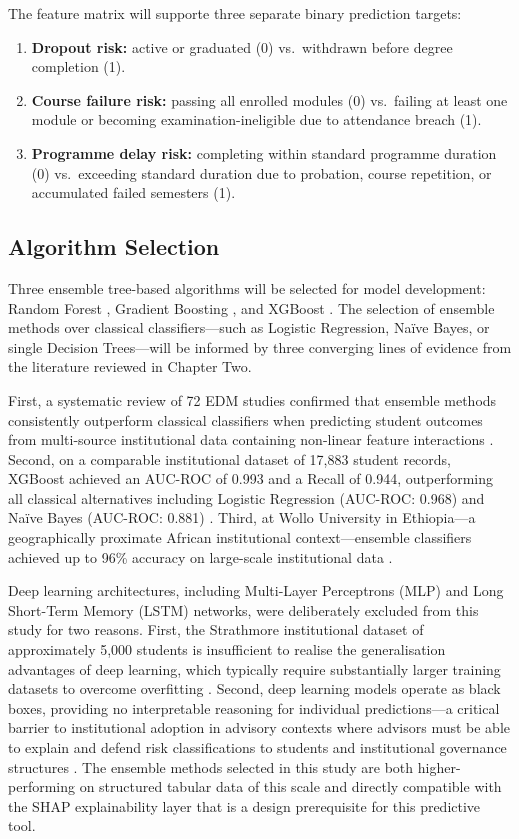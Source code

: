 \documentclass[12pt]{report}
\begin{document}
The feature matrix will supporte three separate binary prediction targets:
\begin{enumerate}
    \item \textbf{Dropout risk:} active or graduated (0) vs.\ withdrawn before
    degree completion (1).
    \item \textbf{Course failure risk:} passing all enrolled modules (0) vs.\
    failing at least one module or becoming examination-ineligible due to
    attendance breach (1).
    \item \textbf{Programme delay risk:} completing within standard programme
    duration (0) vs.\ exceeding standard duration due to probation, course
    repetition, or accumulated failed semesters (1).
\end{enumerate}

\subsection{Algorithm Selection}

Three ensemble tree-based algorithms will be selected for model development:
Random Forest \parencite{breiman2001random}, Gradient Boosting
\parencite{friedman2001greedy}, and XGBoost \parencite{chen2016}. The
selection of ensemble methods over classical classifiers---such as Logistic
Regression, Naïve Bayes, or single Decision Trees---will be informed by three
converging lines of evidence from the literature reviewed in Chapter Two.

First, a systematic review of 72 EDM studies confirmed that ensemble methods
consistently outperform classical classifiers when predicting student outcomes
from multi-source institutional data containing non-linear feature interactions
\parencite{aldowah2026}. Second, on a comparable institutional dataset of
17,883 student records, XGBoost achieved an AUC-ROC of 0.993 and a Recall
of 0.944, outperforming all classical alternatives including Logistic Regression
(AUC-ROC: 0.968) and Naïve Bayes (AUC-ROC: 0.881)
\parencite{bettahi2025}. Third, at Wollo University in Ethiopia---a
geographically proximate African institutional context---ensemble classifiers
achieved up to 96\% accuracy on large-scale institutional data
\parencite{esmael2024}.

Deep learning architectures, including Multi-Layer Perceptrons (MLP) and
Long Short-Term Memory (LSTM) networks, were deliberately excluded from
this study for two reasons. First, the Strathmore institutional dataset of
approximately 5,000 students is insufficient to realise the generalisation
advantages of deep learning, which typically require substantially larger training
datasets to overcome overfitting \parencite{aldowah2026}. Second, deep
learning models operate as black boxes, providing no interpretable reasoning for
individual predictions---a critical barrier to institutional adoption in advisory
contexts where advisors must be able to explain and defend risk classifications
to students and institutional governance structures
\parencite{kwakye2025, zhang2021}. The ensemble methods
selected in this study are both higher-performing on structured tabular data of
this scale and directly compatible with the SHAP explainability layer that is a
design prerequisite for this predictive tool.
\end{document}
